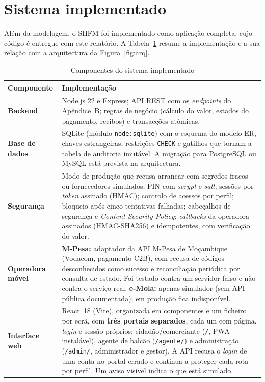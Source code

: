 \documentclass[12pt,a4paper,openany]{report}
\begin{document}
\section{Sistema implementado}
\label{sec:proto}
Além da modelagem, o SIIFM foi implementado como aplicação completa, cujo código é entregue com este relatório. A Tabela~\ref{tab:impl} resume a implementação e a sua relação com a arquitectura da Figura~\ref{fig:arq}.

\begin{table}[!htbp]
\caption{Componentes do sistema implementado}\label{tab:impl}
\begingroup\singlespacing\small
\begin{tabularx}{\textwidth}{@{}>{\bfseries}p{3cm}X@{}}
\toprule
Componente & Implementação \\
\midrule
Backend & Node.js 22 e Express; API REST com os \emph{endpoints} do Apêndice~B; regras de negócio (cálculo do valor, estados do pagamento, recibos) e transacções atómicas. \\
Base de dados & SQLite (módulo \texttt{node:sqlite}) com o esquema do modelo ER, chaves estrangeiras, restrições \texttt{CHECK} e gatilhos que tornam a tabela de auditoria imutável. A migração para PostgreSQL ou MySQL está prevista na arquitectura. \\
Segurança & Modo de produção que recusa arrancar com segredos fracos ou fornecedores simulados; PIN com \emph{scrypt} e \emph{salt}; sessões por \emph{token} assinado (HMAC); controlo de acessos por perfil; bloqueio após cinco tentativas falhadas; cabeçalhos de segurança e \emph{Content-Security-Policy}; \emph{callbacks} da operadora assinados (HMAC-SHA256) e idempotentes, com verificação do valor. \\
Operadora móvel & \textbf{M-Pesa:} adaptador da API M-Pesa de Moçambique (Vodacom, pagamento C2B), com recusa de códigos desconhecidos como sucesso e reconciliação periódica por consulta de estado. Foi testado contra um servidor falso e não contra o serviço real. \textbf{e-Mola:} apenas simulador (sem API pública documentada); em produção fica indisponível. \\
Interface web & React~18 (Vite), organizada em componentes e um ficheiro por ecrã, com \textbf{três portais separados}, cada um com página, \emph{login} e sessão próprios: cidadão/comerciante (\texttt{/}, PWA instalável), agente de balcão (\texttt{/agente/}) e administração (\texttt{/admin/}, administrador e gestor). A API recusa o \emph{login} de uma conta no portal errado e continua a proteger cada rota por perfil. Um aviso visível indica o que está simulado. \\

\end{tabularx}
\end{table}
\end{document}

